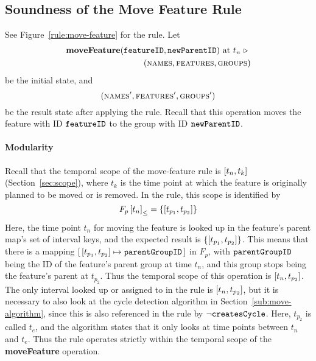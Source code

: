 \subsection{Soundness of the Move Feature Rule}
\label{sub:soundness-of-the-move-reature-rule}

See Figure~\vref{rule:move-feature} for the  rule. Let 
\begin{equation*}
   \begin{split}
      \textbf{moveFeature}(\texttt{featureID}, \texttt{newParentID}) \text{ at } t_n \ \triangleright \  \\
      (\textsc{names}, \textsc{features}, \textsc{groups}{})
   \end{split}
\end{equation*}
be the initial state, and
\[
   (\textsc{names}', \textsc{features}', \textsc{groups}{}')
\]
be the result state after applying the  rule. Recall that this operation moves the feature with ID $\texttt{featureID}$ to the group with ID $\texttt{newParentID}$.

\paragraph{Modularity}
\label{par:scope}
Recall that the temporal scope of the move-feature rule is $\interval{t_n}{t_k}$ (Section~\vref{sec:scope}), where $t_k$ is the time point at which the feature is originally planned to be moved or is removed. In the rule, this scope is identified by 
   \[
      \containing{F_p}{t_n} = \set{\interval{t_{p_1}}{t_{p_2}}}
   \]
   Here, the time point $t_n$ for moving the feature is looked up in the feature's parent map's set of interval keys, and the expected result is $\set{\interval{t_{p_1}}{t_{p_2}}}$. This means that there is a mapping $\intervalmapping{t_{p_1}}{t_{p_2}}{\var{parentGroupID}}$ in $F_p$, with $\texttt{parentGroupID}$ being the ID of the feature's parent group at time $t_n$, and this group stops being the feature's parent at $t_{p_2}$. Thus the temporal scope of this operation is $\interval{t_n}{t_{p_2}}$. The only interval looked up or assigned to in the rule is $\interval{t_n}{t_{p_2}}$, but it is necessary to also look at the cycle detection algorithm in Section~\vref{sub:move-algorithm}, since this is also referenced in the rule by $\neg \texttt{createsCycle}$. Here, $t_{p_2}$ is called $t_e$, and the algorithm states that it only looks at time points between $t_n$ and $t_e$. Thus the rule operates strictly within the temporal scope of the \textbf{moveFeature} operation.

